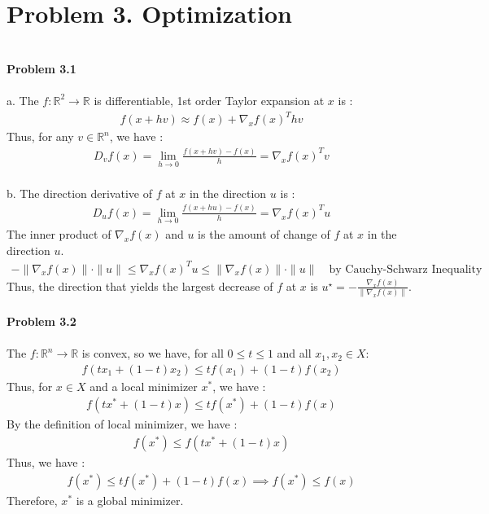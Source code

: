 \section*{Problem 3. Optimization}
\\
\noindent\textbf{Problem 3.1} \\
\\
a. The $f : \mathbb{R}^2 \to \mathbb{R}$ is differentiable, 1st order Taylor expansion at $x$ is :
\begin{align*}
    f(x+hv) \approx f(x) + \nabla_x f(x)^T hv
\end{align*}
Thus, for any $v \in \mathbb{R}^n$, we have :
\begin{align*}
    D_v f(x) = \lim_{h \to 0} \frac{f(x+hv) - f(x)}{h} = \nabla_x f(x)^T v
\end{align*}
\\
b. The direction derivative of $f$ at $x$ in the direction $u$ is :
\begin{align*}
    D_u f(x) = \lim_{h \to 0} \frac{f(x+hu) - f(x)}{h} = \nabla_x f(x)^T u
\end{align*}
The inner product of $\nabla_x f(x)$ and $u$ is the amount of change of $f$ at $x$ in the direction $u$.
\begin{align*}
    - \|\nabla_x f(x) \| \cdot \|u\| \leq \nabla_x f(x)^T u \leq \|\nabla_x f(x) \| \cdot \|u\| \quad \text{by Cauchy-Schwarz Inequality}
\end{align*}
Thus, the direction that yields the largest decrease of $f$ at $x$ is $u^{\star} = - \frac{\nabla_x f(x)}{\|\nabla_x f(x)\|}$.
\\
\\
\noindent\textbf{Problem 3.2} \\
\\
The $f : \mathbb{R}^n \to \mathbb{R}$ is convex, so we have, for all $0 \leq t \leq 1$ and all $x_1, x_2 \in X$:
\begin{align*}
    f(tx_1 + (1-t)x_2) \leq tf(x_1) + (1-t)f(x_2)
\end{align*}
Thus, for $x \in X$ and a local minimizer $x^*$, we have :
\begin{align*}
    f(tx^* + (1-t)x) \leq tf(x^*) + (1-t)f(x)
\end{align*}
By the definition of local minimizer, we have :
\begin{align*}
    f(x^*) \leq f(tx^* + (1-t)x)
\end{align*}
Thus, we have :
\begin{align*}
    f(x^*) \leq tf(x^*) + (1-t)f(x)
    \implies f(x^*) \leq f(x)
\end{align*}
Therefore, $x^*$ is a global minimizer.
